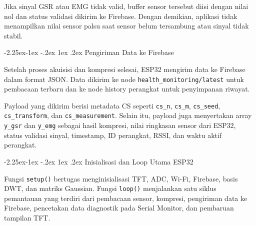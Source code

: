 \documentclass[12pt,a4paper]{report}
\makeatletter
\renewcommand{\subsection}{\@startsection{subsection}{2}{\z@}%
  {-2.25ex\@plus -1ex \@minus -.2ex}%
  {1ex \@plus .2ex}%
  {\normalfont\bfseries\fontsize{12}{14}\selectfont}}
\makeatother
\begin{document}


Jika sinyal GSR atau EMG tidak valid, buffer sensor tersebut diisi dengan nilai nol dan
status validasi dikirim ke Firebase. Dengan demikian, aplikasi tidak menampilkan nilai
sensor palsu saat sensor belum tersambung atau sinyal tidak stabil.

\subsection{Pengiriman Data ke Firebase}

Setelah proses akuisisi dan kompresi selesai, ESP32 mengirim data ke Firebase dalam
format JSON. Data dikirim ke node \texttt{health\_monitoring/latest} untuk pembacaan
terbaru dan ke node history perangkat untuk penyimpanan riwayat.



Payload yang dikirim berisi metadata CS seperti \texttt{cs\_n}, \texttt{cs\_m},
\texttt{cs\_seed}, \texttt{cs\_transform}, dan \texttt{cs\_measurement}. Selain itu,
payload juga menyertakan array \texttt{y\_gsr} dan \texttt{y\_emg} sebagai hasil
kompresi, nilai ringkasan sensor dari ESP32, status validasi sinyal, timestamp, ID
perangkat, RSSI, dan waktu aktif perangkat.

\subsection{Inisialisasi dan Loop Utama ESP32}

Fungsi \texttt{setup()} bertugas menginisialisasi TFT, ADC, Wi-Fi, Firebase, basis DWT,
dan matriks Gaussian. Fungsi \texttt{loop()} menjalankan satu siklus pemantauan yang
terdiri dari pembacaan sensor, kompresi, pengiriman data ke Firebase, pencetakan data
diagnostik pada Serial Monitor, dan pembaruan tampilan TFT.




\end{document}
